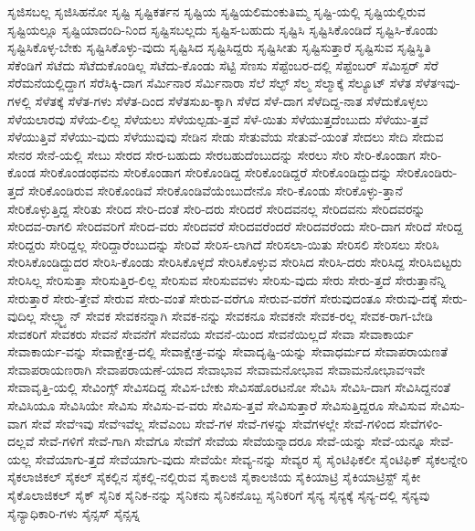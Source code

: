{ಸೃಜಿಸಬಲ್ಲ
ಸೃಜಿಸಿಹನೋ
ಸೃಷ್ಟಿ
ಸೃಷ್ಟಿಕರ್ತನ
ಸೃಷ್ಟಿಯ
ಸೃಷ್ಟಿಯಲಿಮಂಕುತಿಮ್ಮ
ಸೃಷ್ಟಿ-ಯಲ್ಲಿ
ಸೃಷ್ಟಿಯಲ್ಲಿರುವ
ಸೃಷ್ಟಿಯಲ್ಲೂ
ಸೃಷ್ಟಿಯಾದಂದಿ-ನಿಂದ
ಸೃಷ್ಟಿಸಬಲ್ಲದು
ಸೃಷ್ಟಿಸ-ಬಹುದು
ಸೃಷ್ಟಿಸಿ
ಸೃಷ್ಟಿಸಿಕೊಂಡಿದೆ
ಸೃಷ್ಟಿಸಿ-ಕೊಂಡು
ಸೃಷ್ಟಿಸಿಕೊಳ್ಳ-ಬೇಕು
ಸೃಷ್ಟಿಸಿಕೊಳ್ಳು-ವುದು
ಸೃಷ್ಟಿಸಿದ
ಸೃಷ್ಟಿಸಿದ್ದರು
ಸೃಷ್ಟಿಸೀತು
ಸೃಷ್ಟಿಸುತ್ತಾರೆ
ಸೃಷ್ಟಿಸುವ
ಸೃಷ್ಟಿಸ್ಥಿತಿ
ಸೆಕೆಂಡಿಗೆ
ಸೆಟೆದು
ಸೆಟೆದುಕೊಂಡಿಲ್ಲ
ಸೆಟೆದು-ಕೊಂಡು
ಸೆಟ್ಟಿ
ಸೆಣಸು
ಸೆಪ್ಟೆಂಬರ-ದಲ್ಲಿ
ಸೆಪ್ಟೆಂಬರ್
ಸೆಮಿಸ್ಟರ್
ಸೆರೆ
ಸೆರೆಮನೆಯಲ್ಲಿದ್ದಾಗ
ಸೆರೆಸಿಕ್ಕಿ-ದಾಗ
ಸೆರ್ಮಿನಾರ
ಸೆರ್ಮಿನಾರಾ
ಸೆಲೆ
ಸೆಲ್ಫ್
ಸೆಲ್ಮ
ಸೆಲ್ಮಾಕ್ಕೆ
ಸೆಲ್ಯೂಟ್
ಸೆಳೆತ
ಸೆಳೆತಇವು-ಗಳಲ್ಲಿ
ಸೆಳೆತಕ್ಕೆ
ಸೆಳೆತ-ಗಳು
ಸೆಳೆತ-ದಿಂದ
ಸೆಳೆತಸುಖ-ಕ್ಕಾಗಿ
ಸೆಳೆದ
ಸೆಳೆ-ದಾಗ
ಸೆಳೆದಿದ್ದ-ನಾತ
ಸೆಳೆದುಕೊಳ್ಳಲು
ಸೆಳೆಯಲಾರವು
ಸೆಳೆಯ-ಲಿಲ್ಲ
ಸೆಳೆಯಲು
ಸೆಳೆಯಲ್ಪಡು-ತ್ತವೆ
ಸೆಳೆ-ಯಿತು
ಸೆಳೆಯುತ್ತದೆಂಬುದು
ಸೆಳೆಯು-ತ್ತವೆ
ಸೆಳೆಯುತ್ತಿವೆ
ಸೆಳೆಯು-ವುದು
ಸೆಳೆಯುವುವು
ಸೇಡಿನ
ಸೇಡು
ಸೇತುವೆಯ
ಸೇತುವೆ-ಯಂತೆ
ಸೇದಲು
ಸೇದಿ
ಸೇದುವ
ಸೇನರ
ಸೇನೆ-ಯಲ್ಲಿ
ಸೇಬು
ಸೇರದ
ಸೇರ-ಬಹುದು
ಸೇರಬಹುದೆಂಬುದನ್ನು
ಸೇರಲು
ಸೇರಿ
ಸೇರಿ-ಕೊಂಡಾಗ
ಸೇರಿ-ಕೊಂಡ
ಸೇರಿಕೊಂಡಂಥವನು
ಸೇರಿಕೊಂಡಾಗ
ಸೇರಿಕೊಂಡಿದ್ದ
ಸೇರಿಕೊಂಡಿದ್ದರೆ
ಸೇರಿಕೊಂಡಿದ್ದುದನ್ನು
ಸೇರಿಕೊಂಡಿರು-ತ್ತದೆ
ಸೇರಿಕೊಂಡಿರುವ
ಸೇರಿಕೊಂಡಿವೆ
ಸೇರಿಕೊಂಡಿವೆಯೆಂಬುದೇನೊ
ಸೇರಿ-ಕೊಂಡು
ಸೇರಿಕೊಳ್ಳು-ತ್ತಾನೆ
ಸೇರಿಕೊಳ್ಳುತ್ತಿದ್ದ
ಸೇರಿತು
ಸೇರಿದ
ಸೇರಿ-ದಂತೆ
ಸೇರಿ-ದರು
ಸೇರಿದರೆ
ಸೇರಿದವನಲ್ಲ
ಸೇರಿದವನು
ಸೇರಿದವರನ್ನು
ಸೇರಿದವ-ರಾಗಲಿ
ಸೇರಿದವರಿಗೆ
ಸೇರಿದ-ವರು
ಸೇರಿದವರೆ
ಸೇರಿದವರೆಂದರೆ
ಸೇರಿದವರೆಂದು
ಸೇರಿ-ದಾಗ
ಸೇರಿದೆ
ಸೇರಿದ್ದ
ಸೇರಿದ್ದರು
ಸೇರಿದ್ದಲ್ಲ
ಸೇರಿದ್ದಾರೆಂಬುದನ್ನು
ಸೇರಿವೆ
ಸೇರಿಸ-ಲಾಗಿದೆ
ಸೇರಿಸಲಾ-ಯಿತು
ಸೇರಿಸಲಿ
ಸೇರಿಸಲು
ಸೇರಿಸಿ
ಸೇರಿಸಿಕೊಂಡಿದ್ದುದರ
ಸೇರಿಸಿ-ಕೊಂಡು
ಸೇರಿಸಿಕೊಳ್ಳದೆ
ಸೇರಿಸಿಕೊಳ್ಳುವ
ಸೇರಿಸಿದ
ಸೇರಿಸಿ-ದರು
ಸೇರಿಸಿದ್ದ
ಸೇರಿಸಿಬಿಟ್ಟರು
ಸೇರಿಸಿಲ್ಲ
ಸೇರಿಸುತ್ತಾ
ಸೇರಿಸುತ್ತಿರ-ಲಿಲ್ಲ
ಸೇರಿಸುವ
ಸೇರಿಸುವವಳು
ಸೇರಿಸು-ವುದು
ಸೇರು
ಸೇರು-ತ್ತದೆ
ಸೇರುತ್ತಾನೆನ್ನಿ
ಸೇರುತ್ತಾರೆ
ಸೇರು-ತ್ತೇವೆ
ಸೇರುವ
ಸೇರು-ವಂತೆ
ಸೇರುವ-ವರೆಗೂ
ಸೇರುವ-ವರೆಗೆ
ಸೇರುವುದಂತೂ
ಸೇರುವು-ದಕ್ಕೆ
ಸೇರು-ವುದಿಲ್ಲ
ಸೇಲ್ಸ್ಮ್ಯಾನ್
ಸೇವಕ
ಸೇವಕನನ್ನಾಗಿ
ಸೇವಕ-ನನ್ನು
ಸೇವಕನೂ
ಸೇವಕನೇ
ಸೇವಕ-ರಲ್ಲ
ಸೇವಕ-ರಾಗ-ಬೇಡಿ
ಸೇವಕರಿಗೆ
ಸೇವಕರು
ಸೇವನೆ
ಸೇವನೆಗೆ
ಸೇವನೆಯ
ಸೇವನೆ-ಯಿಂದ
ಸೇವನೆಯಿಲ್ಲದೆ
ಸೇವಾ
ಸೇವಾಕಾರ್ಯ
ಸೇವಾಕಾರ್ಯ-ವನ್ನು
ಸೇವಾಕ್ಷೇತ್ರ-ದಲ್ಲಿ
ಸೇವಾಕ್ಷೇತ್ರ-ವನ್ನು
ಸೇವಾದೃಷ್ಟಿ-ಯನ್ನು
ಸೇವಾಧರ್ಮದ
ಸೇವಾಪರಾಯಣತೆ
ಸೇವಾಪರಾಯಣರಾಗಿ
ಸೇವಾಪರಾಯಣೆ-ಯಾದ
ಸೇವಾಭಾವ
ಸೇವಾಮನೋಭಾವ
ಸೇವಾಮನೋಭಾವಇವೇ
ಸೇವಾವೃತ್ತಿ-ಯಲ್ಲಿ
ಸೇವಿಂಗ್ಸ್
ಸೇವಿಸದಿದ್ದ
ಸೇವಿಸ-ಬೇಕು
ಸೇವಿಸಹೊರಟನೋ
ಸೇವಿಸಿ
ಸೇವಿಸಿ-ದಾಗ
ಸೇವಿಸಿದ್ದನಂತೆ
ಸೇವಿಸಿಯೂ
ಸೇವಿಸಿಯೇ
ಸೇವಿಸು
ಸೇವಿಸು-ವ-ವರು
ಸೇವಿಸು-ತ್ತವೆ
ಸೇವಿಸುತ್ತಾರೆ
ಸೇವಿಸುತ್ತಿದ್ದರೂ
ಸೇವಿಸುವ
ಸೇವಿಸು-ವಾಗ
ಸೇವೆ
ಸೇವೆಇವು
ಸೇವೆಇವೆಲ್ಲ
ಸೇವೆಎಂಬ
ಸೇವೆ-ಗಳ
ಸೇವೆ-ಗಳನ್ನು
ಸೇವೆಗಳಲ್ಲೇ
ಸೇವೆ-ಗಳಿಂದ
ಸೇವೆಗಳಿಂ-ದಲ್ಲವೆ
ಸೇವೆ-ಗಳಿಗೆ
ಸೇವೆ-ಗಾಗಿ
ಸೇವೆಗೂ
ಸೇವೆಗೆ
ಸೇವೆಯ
ಸೇವೆಯನ್ನಾದರೂ
ಸೇವೆ-ಯನ್ನು
ಸೇವೆ-ಯನ್ನೂ
ಸೇವೆ-ಯಲ್ಲ
ಸೇವೆಯಾಗು-ತ್ತದೆ
ಸೇವೆಯಾಗು-ವುದು
ಸೇವೆಯೇ
ಸೇವ್ಯ-ನನ್ನು
ಸೇವ್ಯರ
ಸೈ
ಸೈಂಟಿಫಿಕಲೀ
ಸೈಂಟಿಫಿಕ್
ಸೈಕಲನ್ನೇರಿ
ಸೈಕಲಾಜಿಕಲ್
ಸೈಕಲ್
ಸೈಕಲ್ಲಿನ
ಸೈಕಲ್ಲಿ-ನಲ್ಲಿರುವ
ಸೈಕಾಲಜಿ
ಸೈಕಾಲಜಿಯ
ಸೈಕಿಯಾಟ್ರಿ
ಸೈಕಿಯಾಟ್ರಿಸ್ಟ್
ಸೈಕೀ
ಸೈಕೊಲಾಜಿಕಲ್
ಸೈಕ್
ಸೈನಿಕ
ಸೈನಿಕ-ನನ್ನು
ಸೈನಿಕನು
ಸೈನಿಕನೊಬ್ಬ
ಸೈನಿಕರಿಗೆ
ಸೈನ್ಯ
ಸೈನ್ಯಕ್ಕೆ
ಸೈನ್ಯ-ದಲ್ಲಿ
ಸೈನ್ಯವು
ಸೈನ್ಯಾಧಿಕಾರಿ-ಗಳು
ಸೈನ್ಸಸ್
ಸೈನ್ಸಸ್ನ
}
